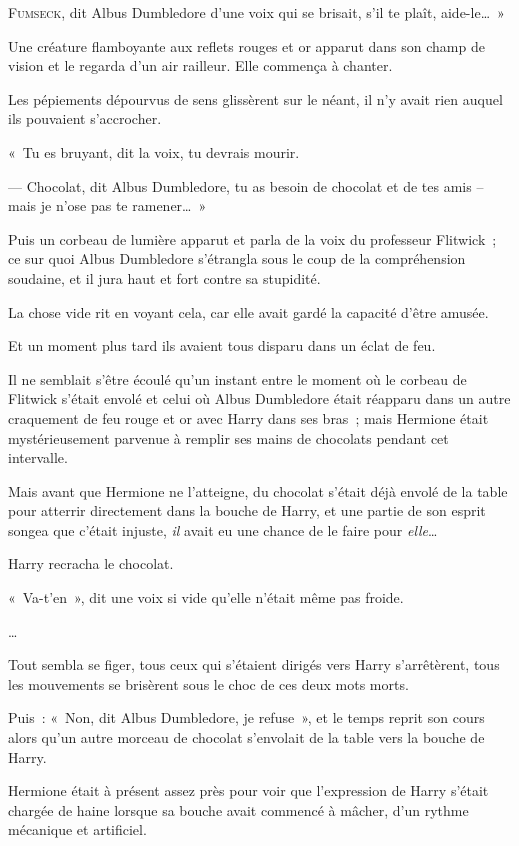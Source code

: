 
\lettrine[ante=«~]{F}{umseck}, dit Albus Dumbledore d'une voix qui se brisait, s'il te plaît, aide-le…~»

Une créature flamboyante aux reflets rouges et or apparut dans son champ de vision et le regarda d'un air railleur. Elle commença à chanter.

Les pépiements dépourvus de sens glissèrent sur le néant, il n'y avait rien auquel ils pouvaient s'accrocher.

«~Tu es bruyant, dit la voix, tu devrais mourir.

--- Chocolat, dit Albus Dumbledore, tu as besoin de chocolat et de tes amis -- mais je n'ose pas te ramener…~»

Puis un corbeau de lumière apparut et parla de la voix du professeur Flitwick~; ce sur quoi Albus Dumbledore s'étrangla sous le coup de la compréhension soudaine, et il jura haut et fort contre sa stupidité.

La chose vide rit en voyant cela, car elle avait gardé la capacité d'être amusée.

\later

Et un moment plus tard ils avaient tous disparu dans un éclat de feu.

Il ne semblait s'être écoulé qu'un instant entre le moment où le corbeau de Flitwick s'était envolé et celui où Albus Dumbledore était réapparu dans un autre craquement de feu rouge et or avec Harry dans ses bras~; mais Hermione était mystérieusement parvenue à remplir ses mains de chocolats pendant cet intervalle.

Mais avant que Hermione ne l'atteigne, du chocolat s'était déjà envolé de la table pour atterrir directement dans la bouche de Harry, et une partie de son esprit songea que c'était injuste, \emph{il} avait eu une chance de le faire pour \emph{elle}…

Harry recracha le chocolat.

«~Va-t'en~», dit une voix si vide qu'elle n'était même pas froide.

…

Tout sembla se figer, tous ceux qui s'étaient dirigés vers Harry s'arrêtèrent, tous les mouvements se brisèrent sous le choc de ces deux mots morts.

Puis~: «~Non, dit Albus Dumbledore, je refuse~», et le temps reprit son cours alors qu'un autre morceau de chocolat s'envolait de la table vers la bouche de Harry.

Hermione était à présent assez près pour voir que l'expression de Harry s'était chargée de haine lorsque sa bouche avait commencé à mâcher, d'un rythme mécanique et artificiel.

